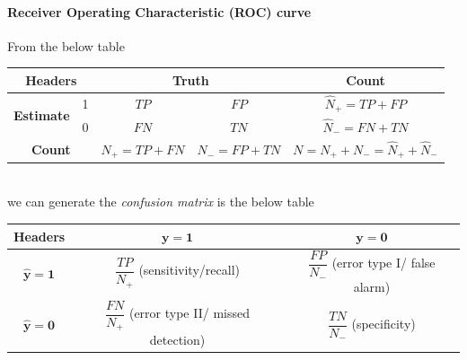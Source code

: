 \paragraph{Receiver Operating Characteristic (ROC) curve}
From the below table \\
\begin{tabular}{|cc|*{3}{c|}}
    \hline
    \multicolumn{2}{|c}{\textbf{Headers}} & \multicolumn{2}{|c|}{\textbf{Truth}} &
    \textbf{Count}\\
    \hline
    \multirow{2}{*}{\textbf{Estimate}} & 1 & $TP$ & $FP$ & $\hat{N}_{+}=TP + FP$\\
                                       & 0 & $FN$ & $TN$ & $\hat{N}_{-}=FN + TN$\\
    \hline
    \multicolumn{2}{|c|}{\textbf{Count}} & $N_{+}=TP+FN$ & $N_{-}=FP+TN$ 
                                       & $N=N_{+}+N_{-}=\hat{N}_{+}+\hat{N}_{-}$\\
    \hline
\end{tabular}\\
we can generate the \emph{confusion matrix} is the below table\\
\begin{tabular}{|*{3}{c|}}
    \hline
    \textbf{Headers} & $\bm{y=1}$ & $\bm{y=0}$\\
    \hline
    $\bm{\hat{y}=1}$ & $\dfrac{TP}{N_{+}}$ (sensitivity/recall) 
                   & $\dfrac{FP}{N_{-}}$ (error type I/ false alarm) \\
    \hline
    $\bm{\hat{y}=0}$ & $\dfrac{FN}{N_{+}}$ (error type II/ missed detection) 
                   & $\dfrac{TN}{N_{-}}$ (specificity) \\
    \hline
\end{tabular}

